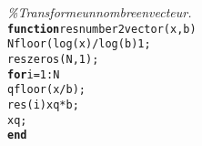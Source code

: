{\begin{tabbing}
\textit{\%\phantom{x}Transforme\phantom{x}un\phantom{x}nombre\phantom{x}en\phantom{x}vecteur{.}}\\
\texttt{\textbf{function}}\texttt{\phantom{x}res\phantom{x}{=}\phantom{x}number2vector{(}x{,}b{)}}\\
\texttt{N\phantom{x}{=}\phantom{x}floor{(}\phantom{x}log{(}x{)}{/}log{(}b{)}\phantom{x}{)}{+}1{;}}\\
\texttt{res\phantom{x}{=}\phantom{x}zeros{(}N{,}1{)}{;}}\\
\texttt{\textbf{for}}\texttt{\phantom{x}i{=}1{:}N}\\
\texttt{\phantom{xxxxxxxx}q\phantom{x}{=}\phantom{x}floor{(}x{/}b{)}{;}}\\
\texttt{\phantom{xxxxxxxx}res{(}i{)}\phantom{x}{=}\phantom{x}x\phantom{x}{-}\phantom{x}q{*}b{;}}\\
\texttt{\phantom{xxxxxxxx}x\phantom{x}{=}\phantom{x}q{;}}\\
\texttt{\textbf{end}}
\end{tabbing}}